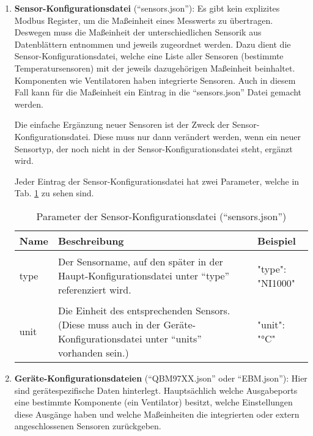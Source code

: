 \begin{enumerate}

	\item \textbf{Sensor-Konfigurationsdatei} (\enquote{sensors.json}): Es gibt kein explizites Modbus Register, um die Maßeinheit eines Messwerts zu übertragen. Deswegen muss die Maßeinheit der unterschiedlichen Sensorik aus Datenblättern entnommen und jeweils zugeordnet werden. Dazu dient die Sensor-Konfigurationsdatei, welche eine Liste aller Sensoren (\zB bestimmte Temperatursensoren) mit der jeweils dazugehörigen Maßeinheit beinhaltet. Komponenten wie Ventilatoren haben integrierte Sensoren. Auch in diesem Fall kann für die Maßeinheit ein Eintrag in die \enquote{sensors.json} Datei gemacht werden. 
	
	Die einfache Ergänzung neuer Sensoren ist der Zweck der Sensor-Konfigurationsdatei. Diese muss nur dann verändert werden, wenn ein neuer Sensortyp, der noch nicht in der Sensor-Konfigurationsdatei steht, ergänzt wird. 
	
	Jeder Eintrag der Sensor-Konfigurationsdatei hat zwei Parameter, welche in Tab. \ref{tab:sensors_json_parameter} zu sehen sind.
		
	\begin{table}[h]
		\caption{Parameter der Sensor-Konfigurationsdatei (\enquote{sensors.json})}
		\label{tab:sensors_json_parameter}
		\begin{tabular}{p{} p{} | p{}}
			\toprule
			\textbf{Name} & \textbf{Beschreibung} & \textbf{Beispiel} \\
			\midrule
			type & Der Sensorname, auf den später in der Haupt-Konfigurationsdatei unter \enquote{type} referenziert wird. &  
			\begin{jsonTable}
"type": "NI1000"
			\end{jsonTable} 
 			\\
			unit & Die Einheit des entsprechenden Sensors. (Diese muss auch in der Geräte-Konfigurationsdatei unter \enquote{units} vorhanden sein.) &  
			\begin{jsonTable}
"unit": "°C"
			\end{jsonTable} 
			\\
			\bottomrule
		\end{tabular}
	\end{table}
	
		
	\item \textbf{Geräte-Konfigurationsdateien} (\zB \enquote{QBM97XX.json} oder \enquote{EBM.json}): Hier sind gerätespezifische Daten hinterlegt. Hauptsächlich welche Ausgabeports eine bestimmte Komponente (\zB ein Ventilator) besitzt, welche Einstellungen diese Ausgänge haben und \ggf welche Maßeinheiten die integrierten oder extern angeschlossenen Sensoren zurückgeben. 
	

\end{enumerate}
